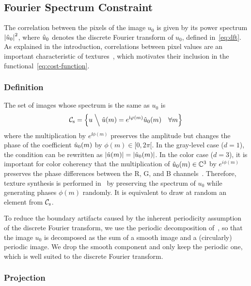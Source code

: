 \subsection{Fourier Spectrum Constraint}
\label{sub:fourier-constraint}

The correlation between the pixels of the image $u_0$ is given by its power spectrum ${\left|\hat{u}_0\right|}^2$, where $\hat{u}_0$ denotes the discrete Fourier transform of $u_0$, defined in~\eqref{eq:dft}.
As explained in the introduction, correlations between pixel values are an important characteristic of textures~\cite{Julesz1981,galerne2011random}, which motivates their inclusion in the functional~\eqref{eq:cost-function}.


\subsubsection{Definition}

The set of images whose spectrum is the same as $u_0$ is
\begin{equation}
  \label{eq:cspec}
  {\mathcal{C}_{\mathrm{s}}} = \left\{
    u \mathrel{}\middle\backslash\mathrel{} \hat{u}(m) = e^{\mathrm{i}\varphi(m)} \hat{u}_0(m) \quad\forall m
  \right\}
\end{equation}
where the multiplication by $e^{\ii\phi(m)}$ preserves the amplitude but changes the phase of the coefficient $\hat{u}_0(m)$ by $\phi(m)\in[0,2\pi[$.
In the gray-level case ($d=1$), the condition can be rewritten as ${\left|\hat{u}(m)\right|} = {\left|\hat{u}_0(m)\right|}$.
In the color case ($d=3$), it is important for color coherency that the multiplication of $\hat{u}_0(m) \in\mathbb{C}^3$ by $e^{i\phi(m)}$ preserves the phase differences between the R, G, and B channels~\cite{galerne2011random}.
Therefore, texture synthesis is performed in~\cite{galerne2011random} by preserving the spectrum of $u_0$ while generating phases $\phi(m)$ randomly.
It is equivalent to draw at random an element from ${\mathcal{C}_{\mathrm{s}}}$.

To reduce the boundary artifacts caused by the inherent periodicity assumption of the discrete Fourier transform, we use the periodic decomposition of~\cite{moisan2011periodic}, so that the image $u_0$ is decomposed as the sum of a smooth image and a (circularly) periodic image.
We drop the smooth component and only keep the periodic one, which is well suited to the discrete Fourier transform.


\subsubsection{Projection}

